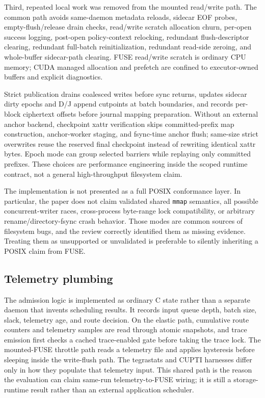 Third, repeated local work was removed from the mounted read/write path.  The common path avoids same-daemon metadata reloads, sidecar EOF probes, empty-flush/release drain checks, read/write scratch allocation churn, per-open success logging, post-open policy-context relocking, redundant flush-descriptor clearing, redundant full-batch reinitialization, redundant read-side zeroing, and whole-buffer sidecar-path clearing.  FUSE read/write scratch is ordinary CPU memory; CUDA managed allocation and prefetch are confined to executor-owned buffers and explicit diagnostics.

Strict publication drains coalesced writes before sync returns, updates sidecar dirty epochs and D/J append cutpoints at batch boundaries, and records per-block ciphertext offsets before journal mapping preparation.  Without an external anchor backend, checkpoint xattr verification skips committed-prefix map construction, anchor-worker staging, and fsync-time anchor flush; same-size strict overwrites reuse the reserved final checkpoint instead of rewriting identical xattr bytes.  Epoch mode can group selected barriers while replaying only committed prefixes.  These choices are performance engineering inside the scoped runtime contract, not a general high-throughput filesystem claim.

The implementation is not presented as a full POSIX conformance layer.  In particular, the paper does not claim validated shared \texttt{mmap} semantics, all possible concurrent-writer races, cross-process byte-range lock compatibility, or arbitrary rename/directory-fsync crash behavior.  Those modes are common sources of filesystem bugs, and the review correctly identified them as missing evidence.  Treating them as unsupported or unvalidated is preferable to silently inheriting a POSIX claim from FUSE.

\subsection{Telemetry plumbing}

The admission logic is implemented as ordinary C state rather than a separate daemon that invents scheduling results.  It records input queue depth, batch size, slack, telemetry age, and route decision.  On the elastic path, cumulative route counters and telemetry samples are read through atomic snapshots, and trace emission first checks a cached trace-enabled gate before taking the trace lock.  The mounted-FUSE throttle path reads a telemetry file and applies hysteresis before sleeping inside the write-flush path.  The tegrastats and CUPTI harnesses differ only in how they populate that telemetry input.  This shared path is the reason the evaluation can claim same-run telemetry-to-FUSE wiring; it is still a storage-runtime result rather than an external application scheduler.

